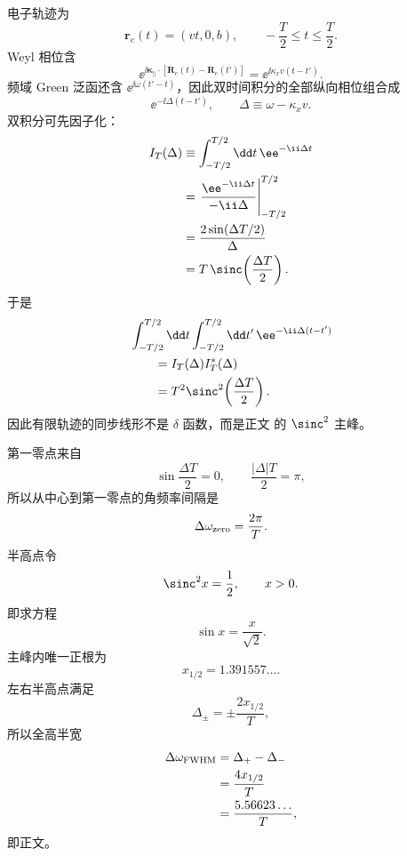 \begin{derivation}[平面界面的混合表象与单位长度损失]
电子轨迹为
\begin{equation*}
 \mathbf r_e(t)=(vt,0,b),
 \qquad -\frac T2\le t\le\frac T2.
\end{equation*}
Weyl 相位含
\begin{equation*}
 \ee^{\ii\boldsymbol\kappa_\parallel\cdot
 [\mathbf R_e(t)-\mathbf R_e(t')]}
 =\ee^{\ii\kappa_xv(t-t')}.
\end{equation*}
频域 Green 泛函还含 $\ee^{\ii\omega(t'-t)}$，因此双时间积分的全部纵向相位组合成
\begin{equation*}
 \ee^{-\ii\Delta(t-t')},
 \qquad
 \Delta\equiv\omega-\kappa_xv.
\end{equation*}
双积分可先因子化：
\begin{align*}
 I_T(\Delta)
 &\equiv
 \int_{-T/2}^{T/2}\dd t\,
 \ee^{-\ii\Delta t}\\
 &=\left.
 \frac{\ee^{-\ii\Delta t}}{-\ii\Delta}
 \right|_{-T/2}^{T/2}\\
 &=\frac{2\sin(\Delta T/2)}{\Delta}\\
 &=T\,\sinc\!\left(\frac{\Delta T}{2}\right).
\end{align*}
于是
\begin{align*}
 &\int_{-T/2}^{T/2}\dd t
 \int_{-T/2}^{T/2}\dd t'\,
 \ee^{-\ii\Delta(t-t')}\\
 &\qquad=I_T(\Delta)I_T^*(\Delta)\\
 &\qquad=T^2\sinc^2\!\left(\frac{\Delta T}{2}\right).
\end{align*}
因此有限轨迹的同步线形不是 $\delta$ 函数，而是正文 的 $\sinc^2$ 主峰。

第一零点来自
\begin{equation*}
 \sin\frac{\Delta T}{2}=0,
 \qquad
 \frac{|\Delta|T}{2}=\pi,
\end{equation*}
所以从中心到第一零点的角频率间隔是
\begin{equation*}
 \Delta\omega_{\rm zero}=\frac{2\pi}{T}.
\end{equation*}
半高点令
\begin{equation*}
 \sinc^2x=\frac12,
 \qquad x>0.
\end{equation*}
即求方程
\begin{equation*}
 \sin x=\frac{x}{\sqrt2}.
\end{equation*}
主峰内唯一正根为
\begin{equation*}
 x_{1/2}=1.391557\ldots.
\end{equation*}
左右半高点满足
\begin{equation*}
 \Delta_\pm=\pm\frac{2x_{1/2}}{T},
\end{equation*}
所以全高半宽
\begin{align*}
 \Delta\omega_{\rm FWHM}
 &=\Delta_+-\Delta_-\\
 &=\frac{4x_{1/2}}{T}\\
 &=\frac{5.56623\ldots}{T},
\end{align*}
即正文。


\end{derivation}
